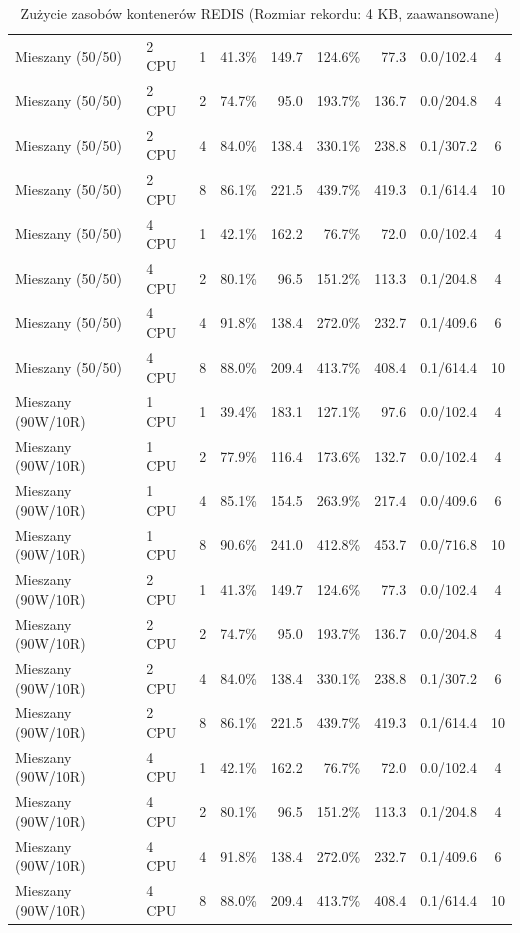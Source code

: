 \begin{table}[ht]
{\begin{tabular}{llcrrrrcc}
Mieszany (50/50) & 2 CPU & 1 & 41.3\% & 149.7 & 124.6\% & 77.3 & 0.0/102.4 & 4 \\
Mieszany (50/50) & 2 CPU & 2 & 74.7\% & 95.0 & 193.7\% & 136.7 & 0.0/204.8 & 4 \\
Mieszany (50/50) & 2 CPU & 4 & 84.0\% & 138.4 & 330.1\% & 238.8 & 0.1/307.2 & 6 \\
Mieszany (50/50) & 2 CPU & 8 & 86.1\% & 221.5 & 439.7\% & 419.3 & 0.1/614.4 & 10 \\
Mieszany (50/50) & 4 CPU & 1 & 42.1\% & 162.2 & 76.7\% & 72.0 & 0.0/102.4 & 4 \\
Mieszany (50/50) & 4 CPU & 2 & 80.1\% & 96.5 & 151.2\% & 113.3 & 0.1/204.8 & 4 \\
Mieszany (50/50) & 4 CPU & 4 & 91.8\% & 138.4 & 272.0\% & 232.7 & 0.1/409.6 & 6 \\
Mieszany (50/50) & 4 CPU & 8 & 88.0\% & 209.4 & 413.7\% & 408.4 & 0.1/614.4 & 10 \\
Mieszany (90W/10R) & 1 CPU & 1 & 39.4\% & 183.1 & 127.1\% & 97.6 & 0.0/102.4 & 4 \\
Mieszany (90W/10R) & 1 CPU & 2 & 77.9\% & 116.4 & 173.6\% & 132.7 & 0.0/102.4 & 4 \\
Mieszany (90W/10R) & 1 CPU & 4 & 85.1\% & 154.5 & 263.9\% & 217.4 & 0.0/409.6 & 6 \\
Mieszany (90W/10R) & 1 CPU & 8 & 90.6\% & 241.0 & 412.8\% & 453.7 & 0.0/716.8 & 10 \\
Mieszany (90W/10R) & 2 CPU & 1 & 41.3\% & 149.7 & 124.6\% & 77.3 & 0.0/102.4 & 4 \\
Mieszany (90W/10R) & 2 CPU & 2 & 74.7\% & 95.0 & 193.7\% & 136.7 & 0.0/204.8 & 4 \\
Mieszany (90W/10R) & 2 CPU & 4 & 84.0\% & 138.4 & 330.1\% & 238.8 & 0.1/307.2 & 6 \\
Mieszany (90W/10R) & 2 CPU & 8 & 86.1\% & 221.5 & 439.7\% & 419.3 & 0.1/614.4 & 10 \\
Mieszany (90W/10R) & 4 CPU & 1 & 42.1\% & 162.2 & 76.7\% & 72.0 & 0.0/102.4 & 4 \\
Mieszany (90W/10R) & 4 CPU & 2 & 80.1\% & 96.5 & 151.2\% & 113.3 & 0.1/204.8 & 4 \\
Mieszany (90W/10R) & 4 CPU & 4 & 91.8\% & 138.4 & 272.0\% & 232.7 & 0.1/409.6 & 6 \\
Mieszany (90W/10R) & 4 CPU & 8 & 88.0\% & 209.4 & 413.7\% & 408.4 & 0.1/614.4 & 10 \\
\bottomrule
\end{tabular}%
}
\caption{Zużycie zasobów kontenerów REDIS (Rozmiar rekordu: 4 KB, zaawansowane)}
\label{tab:resources_redis_medium_0}
\end{table}
